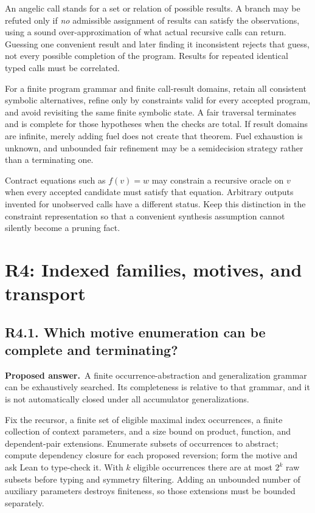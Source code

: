 \documentclass[11pt,a4paper]{article}
\newcommand{\question}[2]{\subsection{#1. #2}\label{q:#1}}
\newcommand{\answer}{\textbf{Proposed answer.}\ }
\theoremstyle{remark}
\begin{document}
An angelic call stands for a set or relation of possible results. A branch
may be refuted only if \emph{no} admissible assignment of results can satisfy
the observations, using a sound over-approximation of what actual recursive
calls can return. Guessing one convenient result and later finding it
inconsistent rejects that guess, not every possible completion of the
program. Results for repeated identical typed calls must be correlated.

For a finite program grammar and finite call-result domains, retain all
consistent symbolic alternatives, refine only by constraints valid for every
accepted program, and avoid revisiting the same finite symbolic state. A
fair traversal terminates and is complete for those hypotheses when the
checks are total. If result domains are infinite, merely adding fuel does
not create that theorem. Fuel exhaustion is unknown, and unbounded fair
refinement may be a semidecision strategy rather than a terminating one.

Contract equations such as $f(v)=w$ may constrain a recursive oracle on $v$
when every accepted candidate must satisfy that equation. Arbitrary outputs
invented for unobserved calls have a different status. Keep this distinction
in the constraint representation so that a convenient synthesis assumption
cannot silently become a pruning fact.

\section{R4: Indexed families, motives, and transport}
\label{sec:r4}

\question{R4.1}{Which motive enumeration can be complete and terminating?}

\answer A finite occurrence-abstraction and generalization grammar can be
exhaustively searched. Its completeness is relative to that grammar, and it
is not automatically closed under all accumulator generalizations.

Fix the recursor, a finite set of eligible maximal index occurrences, a
finite collection of context parameters, and a size bound on product,
function, and dependent-pair extensions. Enumerate subsets of occurrences
to abstract; compute dependency closure for each proposed reversion; form
the motive and ask Lean to type-check it. With $k$ eligible occurrences
there are at most $2^k$ raw subsets before typing and symmetry filtering.
Adding an unbounded number of auxiliary parameters destroys finiteness, so
those extensions must be bounded separately.
\end{document}
